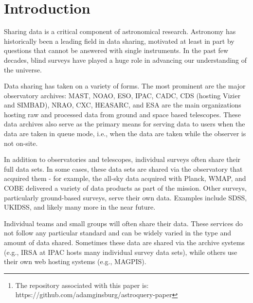 \documentclass[twocolumn]{aastex61}
\begin{document}
\begin{abstract}
Astroquery is a collection of tools for requesting data from databases hosted
on the internet, particularly those with web pages but without formal
application program interfaces (APIs).  These tools are based on the Python
requests module, which is used to make HTTP requests, and astropy, which
provides most of the data parsing functionality.  Astroquery has received
significant contributions from the broader astronomical community, including
several significant contributions from telescope archives.
\footnote{
The repository associated with this paper is:
https://github.com/adamginsburg/astroquery-paper
}
\end{abstract}


\section{Introduction}
Sharing data is a critical component of astronomical research.  Astronomy
has historically been a leading field in data sharing, motivated at least
in part by questions that cannot be answered with single instruments.
In the past few decades, blind surveys have played a huge role in advancing our
understanding of the universe.

Data sharing has taken on a variety of forms.  The most prominent are the major
observatory archives: MAST, NOAO, ESO, IPAC, CADC, CDS (hosting Vizier and
SIMBAD), NRAO, CXC, HEASARC, and ESA are the main
organizations hosting raw and processed data from ground and space based
telescopes.  These data archives also serve as the primary means for serving data
to users when the data are taken in queue mode, i.e., when the data are taken
while the observer is not on-site.

In addition to observatories and telescopes, individual surveys often share
their full data sets.  In some cases, these data sets are shared via the
observatory that acquired them - for example, the all-sky data acquired with
Planck, WMAP, and COBE delivered a variety of data products as part of the
mission.  Other surveys, particularly ground-based surveys, serve their own
data.  Examples include SDSS, UKIDSS, and likely many more in the near future.

Individual teams and small groups will often share their data.
These services do not follow any particular standard and can be widely
varied in the type and amount of data shared.  Sometimes these data
are shared via the archive systems (e.g., IRSA at IPAC hosts many
individual survey data sets), while others use their own web hosting
systems (e.g., MAGPIS).
\end{document}
